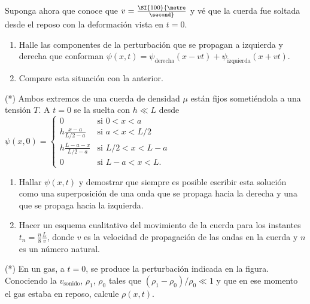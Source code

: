 	Suponga ahora que conoce que $v = \SI{100}{\metre\over\second}$ y vé que la cuerda fue soltada desde el reposo con la deformación vista en $t=0$.
\begin{enumerate}
	\item Halle las componentes de la perturbación que se propagan a izquierda y derecha que conforman $\psi(x,t) = \psi_\text{derecha} (x - v t ) + \psi_\text{izquierda} ( x + v t )$.
	\item Compare esta situación con la anterior.
\end{enumerate}



\item (*) Ambos extremos de una cuerda de densidad $\mu$ están fijos sometiéndola a una tensión $T$.
A $t=0$ se la suelta con $h \ll L$ desde
$
\psi(x,0)=\begin{cases}
0 & \mbox{si }0<x<a\\
h\frac{x-a}{L/2-a} & \mbox{si }a<x<L/2\\
h\frac{L-a-x}{L/2-a} & \mbox{si }L/2<x<L-a\\
0 & \mbox{si }L-a<x<L .
\end{cases}
$
\begin{enumerate}
	\item Hallar $\psi(x,t)$ y demostrar que siempre es posible escribir esta solución como una superposición de una onda que se propaga hacia la derecha y una que se propaga hacia la izquierda.
	\item Hacer un esquema cualitativo del movimiento de la cuerda para los instantes $t_n = \frac{n}{8} \frac{L}{v}$, donde $v$ es la velocidad de propagación de las ondas en la cuerda y $n$ es un número natural.
\end{enumerate}


\item 
\begin{minipage}[t][1.5cm]{0.7\textwidth}
(*) En un gas, a $t=0$, se produce la perturbación indicada en la figura.
Conociendo la $v_\text{sonido}$, $\rho_{1}$, $\rho_{0}$ tales que $(\rho_{1}-\rho_{0})/\rho_{0}\ll1$ y que en ese momento el gas estaba en reposo, calcule $\rho(x,t)$.
\end{minipage}
\begin{minipage}[c][1.6cm][t]{0.2\textwidth}
\end{minipage}


